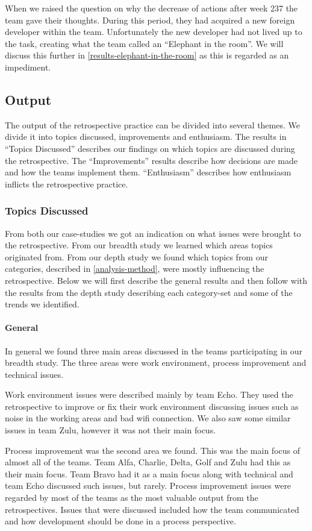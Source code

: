 When we raised the question on why the decrease of actions after week 237 the team gave their thoughts. During this period, they had acquired a new foreign developer within the team. Unfortunately the new developer had not lived up to the task, creating what the team called an ``Elephant in the room''. We will discuss this further in \autoref{results-elephant-in-the-room} as this is regarded as an impediment. 

\subsection{Output}
The output of the retrospective practice can be divided into several themes. We divide it into topics discussed, improvements and enthusiasm. 
The results in ``Topics Discussed'' describes our findings on which topics are discussed during the retrospective. The ``Improvements'' results describe how decisions are made and how the teams implement them. ``Enthusiasm'' describes how enthusiasm inflicts the retrospective practice. 

\subsubsection{Topics Discussed}
From both our case-studies we got an indication on what issues were brought to the retrospective. From our breadth study we learned which areas topics originated from. From our depth study we found which topics from our categories, described in \autoref{analysis-method}, were mostly influencing the retrospective. Below we will first describe the general results and then follow with the results from the depth study describing each category-set and some of the trends we identified. 

\paragraph{General}
In general we found three main areas discussed in the teams participating in our breadth study. The three areas were work environment, process improvement and technical issues. 

Work environment issues were described mainly by team Echo. They used the retrospective to improve or fix their work environment discussing issues such as noise in the working areas and bad wifi connection. We also saw some similar issues in team Zulu, however it was not their main focus. 

Process improvement was the second area we found. This was the main focus of almost all of the teams. Team Alfa, Charlie, Delta, Golf and Zulu had this as their main focus. Team Bravo had it as a main focus along with technical and team Echo discussed such issues, but rarely. Process improvement issues were regarded by most of the teams as the most valuable output from the retrospectives. Issues that were discussed included how the team communicated and how development should be done in a process perspective. 

